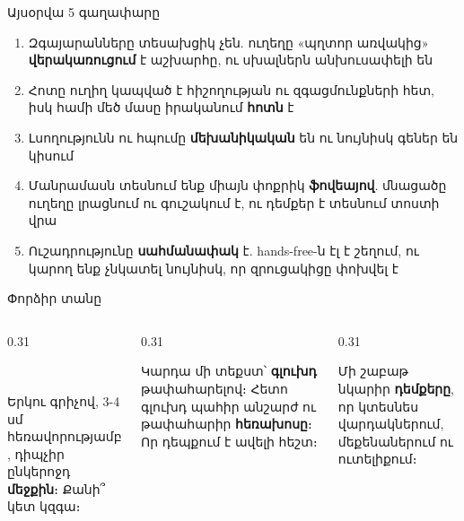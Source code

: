 \notopic

\begin{frame}{Այսօրվա 5 գաղափարը}
  \begin{enumerate}
    \item<1-> Զգայարանները տեսախցիկ չեն. ուղեղը «պղտոր առվակից» \textbf{վերակառուցում} է աշխարհը, ու սխալներն անխուսափելի են
    \item<2-> Հոտը ուղիղ կապված է հիշողության ու զգացմունքների հետ, իսկ համի մեծ մասը իրականում \textbf{հոտն} է
    \item<3-> Լսողությունն ու հպումը \textbf{մեխանիկական} են ու նույնիսկ գեներ են կիսում
    \item<4-> Մանրամասն տեսնում ենք միայն փոքրիկ \textbf{ֆովեայով}. մնացածը ուղեղը լրացնում ու գուշակում է, ու դեմքեր է տեսնում տոստի վրա
    \item<5-> Ուշադրությունը \textbf{սահմանափակ} է. hands-free-ն էլ է շեղում, ու կարող ենք չնկատել նույնիսկ, որ զրուցակիցը փոխվել է
  \end{enumerate}
\end{frame}

\begin{frame}{Փորձիր տանը}
  \begin{columns}[T]
    \begin{column}{0.31\textwidth}
      \begin{card}[colback=mint!30!cardwhite]
        \centering{}\ \par\smallskip
        \raggedright Երկու գրիչով, 3-4 սմ հեռավորությամբ, դիպչիր ընկերոջդ \textbf{մեջքին}։ Քանի՞ կետ կզգա։
      \end{card}
    \end{column}
    \begin{column}{0.31\textwidth}
      \begin{card}[colback=lavender!35!cardwhite]
        \centering{}\par\smallskip
        \raggedright Կարդա մի տեքստ՝ \textbf{գլուխդ} թափահարելով։ Հետո գլուխդ պահիր անշարժ ու թափահարիր \textbf{հեռախոսը}։ Որ դեպքում է ավելի հեշտ։
      \end{card}
    \end{column}
    \begin{column}{0.31\textwidth}
      \begin{card}[colback=peach!35!cardwhite]
        \centering{}\par\smallskip
        \raggedright Մի շաբաթ նկարիր \textbf{դեմքերը}, որ կտեսնես վարդակներում, մեքենաներում ու ուտելիքում։
      \end{card}
    \end{column}
  \end{columns}
\end{frame}

